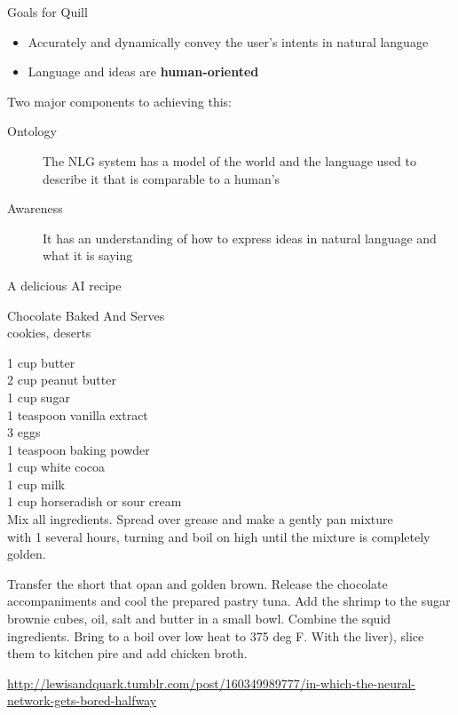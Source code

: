 \documentclass[10pt, compress]{beamer}
\begin{document}
\begin{frame}{Goals for Quill}
	\begin{itemize}
		\item Accurately and dynamically convey the user's intents in natural language
		\item Language and ideas are \textbf{human-oriented} \pause
	\end{itemize}

    \vspace{20pt}
    Two major components to achieving this: \pause

	\begin{description}
		\item[Ontology] The NLG system has a model of the world and the language used to describe it that is comparable to a human's \pause
		\item[Awareness] It has an understanding of how to express ideas in natural language and what it is saying
	\end{description}
\end{frame}

\begin{frame}{A delicious AI recipe}

	\footnotesize
	Chocolate Baked And Serves	\\
	cookies, deserts

	1 cup butter	\\
	2 cup peanut butter	\\
	1 cup sugar \\
	1 teaspoon vanilla extract	\\
	3  eggs \\
	1 teaspoon baking powder \\
	1 cup white cocoa \\
	1 cup milk \\
	1 cup horseradish or sour cream \\

	Mix all ingredients.  Spread over grease and make a gently pan mixture \\
	with 1 several hours, turning and boil on high until the mixture is completely golden.

	Transfer the short that opan and golden brown. Release the chocolate
	accompaniments and cool the prepared pastry tuna. Add the shrimp to the sugar brownie cubes, oil, salt and butter in a small bowl. Combine the squid ingredients. Bring to a boil over low heat to 375 deg F. With the liver), slice them to kitchen pire and add chicken broth.

	{\tiny \href{http://lewisandquark.tumblr.com/post/160349989777/in-which-the-neural-network-gets-bored-halfway}{http://lewisandquark.tumblr.com/post/160349989777/in-which-the-neural-network-gets-bored-halfway}}
\end{frame}
\end{document}
